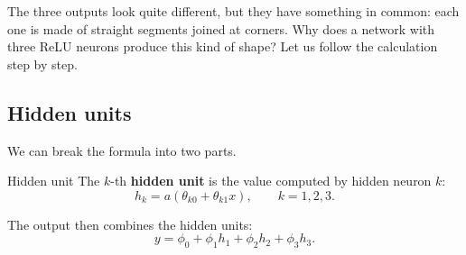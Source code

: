\documentclass[a4paper,12pt,oneside]{report}
\begin{document}
\newcommand{\nnpanel}[5]{%
  \begin{scope}[xshift=#1]
    \draw[black!25,dashed] (0,0)--(2,0);
    \begin{scope}
      \clip (0,-1) rectangle (2,1);
      \draw[#4,very thick,domain=0:2,samples=81] plot (\x,{#3});
    \end{scope}
    \draw[black!60] (0,-1) rectangle (2,1);
    \foreach \t in {0,1,2}{
      \draw[black!60] (\t,-1)--(\t,-0.94);
      \node[below,font=\tiny,black!70] at (\t,-1) {$\t$};
    }
    \foreach \t in {-1,0,1}{
      \node[left,font=\tiny,black!70] at (0,\t) {$\t$};
    }
    \node[font=\scriptsize,text=#4] at (1,-0.72) {#5};
    \node[font=\small,anchor=south east] at (-0.12,1.02) {#2};
  \end{scope}}

\begin{center}
\end{center}

The three outputs look quite different, but they have something in
common: each one is made of straight segments joined at corners. Why
does a network with three ReLU neurons produce this kind of shape? Let us follow the calculation step by step.

\subsection{Hidden units}

We can break the formula into two parts.

\begin{frameddefn}{Hidden unit}\label{def:hidden-unit}
The $k$-th \textbf{hidden unit} is the value computed by hidden
neuron $k$:
\[
  h_k=a(\theta_{k0}+\theta_{k1}x),\qquad k=1,2,3.
\]
\end{frameddefn}

The output then combines the hidden units:
\[
  y=\phi_0+\phi_1h_1+\phi_2h_2+\phi_3h_3.
\]
\end{document}
